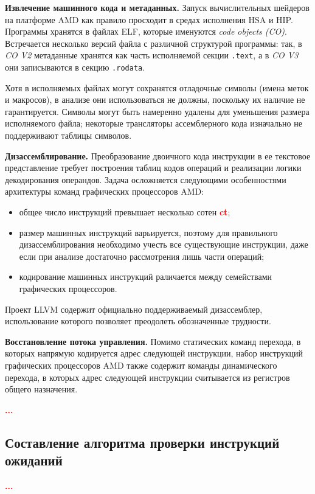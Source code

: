 \documentclass[a4paper,14pt]{extarticle}
\newcommand{\todo}[1]{\textbf{\textcolor{red}{#1}}}
\newcommand{\topic}[1]{\textbf{#1.}}
\newenvironment{ul}{\begin{itemize}[noitemsep,topsep=0em]}{\end{itemize}\vspace{4mm}}
\begin{document}
\topic{Извлечение машинного кода и метаданных} Запуск вычислительных шейдеров на платформе AMD
как правило просходит в средах исполнения HSA и HIP. Программы хранятся в файлах ELF,
которые именуются \textit{code objects (CO)}.
Встречается несколько версий файла с различной структурой программы: так,
в \textit{CO V2} метаданные хранятся как часть исполняемой секции \texttt{.text}, а
в \textit{CO V3} они записываются в секцию \texttt{.rodata}.

Хотя в исполняемых файлах могут сохранятся отладочные символы
(имена меток и макросов), в анализе они использоваться не должны, поскольку их наличие не гарантируется.
Символы могут быть намеренно удалены для уменьшения размера исполняемого файла;
некоторые трансляторы ассемблерного кода изначально не поддерживают таблицы символов.

\topic{Дизассемблирование} Преобразование двоичного кода инструкции в ее текстовое представление
требует построения таблиц кодов операций и реализации логики декодирования операндов.
Задача осложняется следующими особенностями архитектуры команд графических процессоров AMD:
\begin{ul}
\item общее число инструкций превышает несколько сотен \todo{ct};
\item размер машинных инструкций варьируется, поэтому для правильного дизассемблирования необходимо
  учесть все существующие инструкции, даже если при анализе достаточно рассмотрения лишь части операций;
\item кодирование машинных инструкций раличается между семействами графических процессоров.
\end{ul}

Проект LLVM содержит официально поддерживаемый дизассемблер, использование которого позволяет
преодолеть обозначенные трудности.

\topic{Восстановление потока управления} Помимо статических команд перехода, в которых напрямую
кодируется адрес следующей инструкции, набор инструкций графических процессоров AMD также содержит
команды динамического перехода, в которых адрес следующей инструкции считывается из регистров
общего назначения.

\todo{...}

\subsection{Составление алгоритма проверки инструкций ожиданий}

\todo{...}
\end{document}
